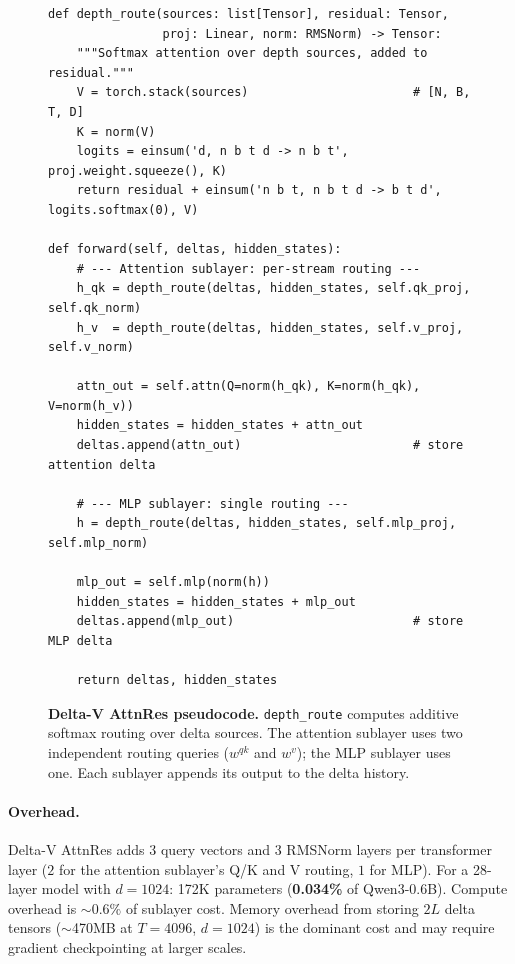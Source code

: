 \documentclass{article}
\begin{document}
\begin{figure}[t]
\begin{lstlisting}[style=python]
def depth_route(sources: list[Tensor], residual: Tensor,
                proj: Linear, norm: RMSNorm) -> Tensor:
    """Softmax attention over depth sources, added to residual."""
    V = torch.stack(sources)                       # [N, B, T, D]
    K = norm(V)
    logits = einsum('d, n b t d -> n b t', proj.weight.squeeze(), K)
    return residual + einsum('n b t, n b t d -> b t d', logits.softmax(0), V)

def forward(self, deltas, hidden_states):
    # --- Attention sublayer: per-stream routing ---
    h_qk = depth_route(deltas, hidden_states, self.qk_proj, self.qk_norm)
    h_v  = depth_route(deltas, hidden_states, self.v_proj,  self.v_norm)

    attn_out = self.attn(Q=norm(h_qk), K=norm(h_qk), V=norm(h_v))
    hidden_states = hidden_states + attn_out
    deltas.append(attn_out)                        # store attention delta

    # --- MLP sublayer: single routing ---
    h = depth_route(deltas, hidden_states, self.mlp_proj, self.mlp_norm)

    mlp_out = self.mlp(norm(h))
    hidden_states = hidden_states + mlp_out
    deltas.append(mlp_out)                         # store MLP delta

    return deltas, hidden_states
\end{lstlisting}
\caption{\textbf{Delta-V AttnRes pseudocode.} \texttt{depth\_route} computes additive softmax routing over delta sources. The attention sublayer uses two independent routing queries ($w^{qk}$ and $w^v$); the MLP sublayer uses one. Each sublayer appends its output to the delta history.}
\label{fig:code}
\end{figure}

\paragraph{Overhead.} Delta-V AttnRes adds $3$ query vectors and $3$ RMSNorm layers per transformer layer ($2$ for the attention sublayer's Q/K and V routing, $1$ for MLP). For a 28-layer model with $d{=}1024$: 172K parameters (\textbf{0.034\%} of Qwen3-0.6B). Compute overhead is ${\sim}0.6\%$ of sublayer cost. Memory overhead from storing $2L$ delta tensors (${\sim}$470MB at $T{=}4096$, $d{=}1024$) is the dominant cost and may require gradient checkpointing at larger scales.
\end{document}
